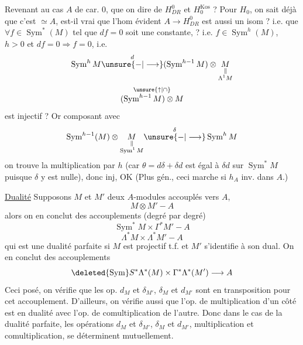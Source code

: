 Revenant au cas $A$ de car. $0$, que  on dire de $H^0_{DR}$ et $H_0^{\mathrm{Kos}}$ ? Pour $H_0$, on sait déjà que c'est $\simeq A$, est-il vrai que l'hom évident $A\longrightarrow H^0_{DR}$ est aussi un isom ?  i.e. que $\forall f\in\operatorname{Sym}^*(M)$ tel que $df=0$ soit  une constante, ? i.e.  $f\in\operatorname{Sym}^h(M)$, $h>0$ et $df=0\Longrightarrow f=0$, i.e.
\[
\operatorname{Sym}^hM\overset{d}{\unsure{-|\longrightarrow}}(\operatorname{Sym}^{h-1}M)\otimes\underset{\substack{\Vert\\\Lambda^1M}}{M}
\]
\[
\overset{\unsure{\uparrow|\cap}}{(\operatorname{Sym}^{h-1}M)\otimes M}
\]
est injectif ? Or composant avec
\[
\operatorname{Sym}^{h-1}(M)\otimes\underset{\substack{\Vert\\\operatorname{Sym}^1M}}{M}\overset{\delta}{\unsure{-|\longrightarrow}}\operatorname{Sym}^hM
\]
on trouve la multiplication par $h$ (car $\theta=d\delta+\delta d$ est égal à $\delta d$ sur $\operatorname{Sym}^*M$ puisque $\delta$ y est nulle), donc inj, OK (Plus gén., ceci marche si $h_A$ inv. dans $A$.)

\uline{Dualité} Supposons $M$ et $M'$ deux $A$-modules accouplés vers $A$,
\[
M\otimes M'-A
\]
alors on en conclut des accouplements (degré par degré)
\[
\operatorname{Sym}^*M\times\Gamma^*M'-A
\]
\[
\Lambda^*M\times\Lambda^*M'-A
\]
qui est une dualité parfaite si $M$ est projectif t.f. et $M'$ s'identifie à son dual. On en conclut des accouplements
\[
\deleted{\operatorname{Sym}}S^*\Lambda^*(M)\times\Gamma^*\Lambda^*(M')\longrightarrow A
\]
Ceci posé, on vérifie que les op. $d_M$ et $\delta_{M'}$, $\delta_M$ et $d_{M'}$ sont  en transposition pour cet accouplement. D'ailleurs, on vérifie aussi que l'op. de multiplication d'un côté est en dualité avec l'op. de comultiplication de l'autre. Donc dans le cas de la dualité parfaite, les opérations $d_M$ et $\delta_{M'}$, $\delta_M$ et $d_{M'}$, multiplication et comultiplication, se déterminent mutuellement.
